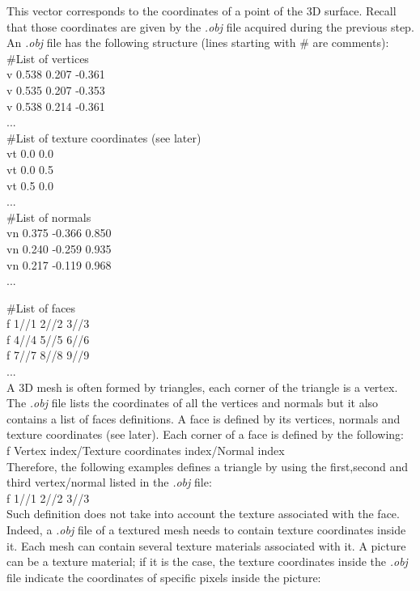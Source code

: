 This vector corresponds to the coordinates of a point of the 3D surface. Recall that those coordinates are given by the \textit{.obj} file acquired during the previous step. An \textit{.obj} file has the following structure (lines starting with \# are comments):\\

\noindent\#List of vertices\\ 
v 0.538 0.207 -0.361\\
v 0.535 0.207 -0.353\\
v 0.538 0.214 -0.361\\
...\\

\noindent\#List of texture coordinates (see later)\\
vt 0.0 0.0\\
vt 0.0 0.5\\
vt 0.5 0.0\\
...\\

\noindent\#List of normals\\
vn 0.375 -0.366 0.850\\
vn 0.240 -0.259 0.935\\
vn 0.217 -0.119 0.968\\
...

\noindent\#List of faces\\
f 1//1 2//2 3//3\\
f 4//4 5//5 6//6\\
f 7//7 8//8 9//9\\
...\\

A 3D mesh is often formed by triangles, each corner of the triangle is a vertex. The \textit{.obj} file lists the coordinates of all the vertices and normals but it also contains a list of faces definitions. A face is defined by its vertices, normals and texture coordinates (see later). Each corner of a face is defined by the following:\\

\noindent f Vertex index/Texture coordinates index/Normal index \\

Therefore, the following examples defines a triangle by using the first,second and third vertex/normal listed in the \textit{.obj} file:\\

\noindent f 1//1 2//2 3//3\\

Such definition does not take into account the texture associated with the face. Indeed, a \textit{.obj} file of a textured mesh needs to contain texture coordinates inside it. Each mesh can contain several texture materials associated with it. A picture can be a texture material; if it is the case, the texture coordinates inside the \textit{.obj} file indicate the coordinates of specific pixels inside the picture: \\


